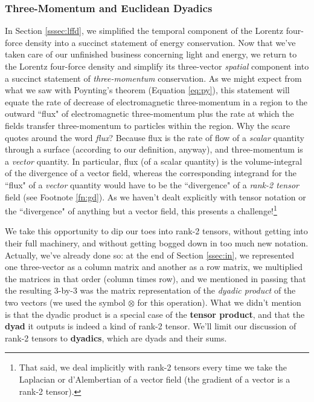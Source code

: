 \documentclass[12pt]{article}
\begin{document}
\subsubsection{Three-Momentum and Euclidean Dyadics}\label{sssec:emm}

In Section \ref{sssec:lffd}, we simplified the temporal component of the Lorentz four-force density into a succinct statement of energy conservation. Now that we've taken care of our unfinished business concerning light and energy, we return to the Lorentz four-force density and simplify its three-vector \emph{spatial} component into a succinct statement of \emph{three-momentum} conservation. As we might expect from what we saw with Poynting's theorem (Equation \ref{eq:py}), this statement will equate the rate of decrease of electromagnetic three-momentum in a region to the outward ``flux" of electromagnetic three-momentum plus the rate at which the fields transfer three-momentum to particles within the region. Why the scare quotes around the word \emph{flux}? Because flux is the rate of flow of a \emph{scalar} quantity through a surface (according to our definition, anyway), and three-momentum is a \emph{vector} quantity. In particular, flux (of a scalar quantity) is the volume-integral of the divergence of a vector field, whereas the corresponding integrand for the ``flux" of a \emph{vector} quantity would have to be the ``divergence" of a \emph{rank-2 tensor} field (see Footnote \ref{fn:gd}). As we haven't dealt explicitly with tensor notation or the ``divergence" of anything but a vector field, this presents a challenge!\footnote{That said, we deal implicitly with rank-2 tensors every time we take the Laplacian or d'Alembertian of a vector field (the gradient of a vector is a rank-2 tensor).}

We take this opportunity to dip our toes into rank-2 tensors, without getting into their full machinery, and without getting bogged down in too much new notation. Actually, we've already done so: at the end of Section \ref{ssec:in}, we represented one three-vector as a column matrix and another as a row matrix, we multiplied the matrices in that order (column times row), and we mentioned in passing that the resulting 3-by-3 was the matrix representation of the \emph{dyadic product} of the two vectors (we used the symbol $\otimes$ for this operation). What we didn't mention is that the dyadic product is a special case of the \textbf{tensor product}, and that the \textbf{dyad} it outputs is indeed a kind of rank-2 tensor. We'll limit our discussion of rank-2 tensors to \textbf{dyadics}, which are dyads and their sums.
\end{document}
